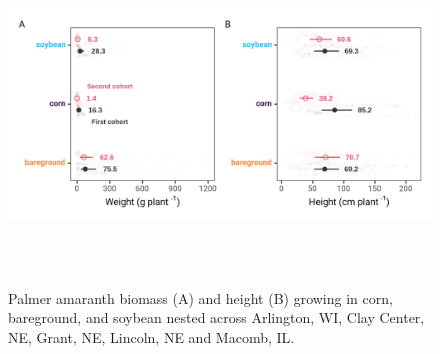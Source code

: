 \documentclass[utf8]{frontiersSCNS}
\begin{document}
\begin{figure}

{\centering \includegraphics[width=150mm,height=90mm]{../data analysis/figures/Figure 3} 

}

\caption{Palmer amaranth biomass (A) and height (B) growing in corn, bareground, and soybean nested across Arlington, WI, Clay Center, NE, Grant, NE, Lincoln, NE and Macomb, IL.}\label{fig:Figure-3}
\end{figure}
\end{document}
